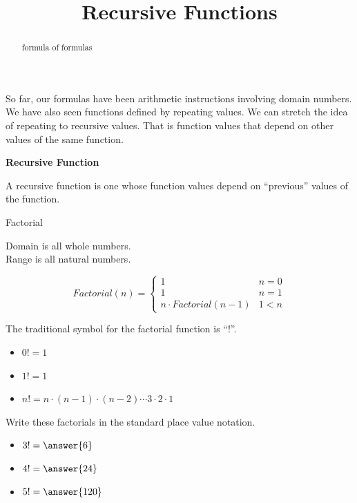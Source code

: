\documentclass{ximera}
\title{Recursive Functions}
\begin{document}
\begin{abstract}
formula of formulas
\end{abstract}
\maketitle



So far, our formulas have been arithmetic instructions involving domain numbers. We have also seen functions defined by repeating values. We can stretch the idea of repeating to recursive values.  That is function values that depend on other values of the same function.





\begin{idea} \textbf{\textcolor{blue!55!black}{Recursive Function}}


A recursive function is one whose function values depend on ``previous'' values of the function.

\end{idea}


\begin{example}  Factorial 



Domain is all whole numbers. \\
Range is all natural numbers. 




\[
Factorial(n) = 
\begin{cases}
  1 & n = 0 \\
  1 & n = 1 \\ 
  n \cdot Factorial(n-1) & 1 < n
\end{cases}
\]

The traditional symbol for the factorial function is ``!''.


\begin{itemize}
  \item $0! = 1$
  \item $1! = 1$
  \item $n! = n \cdot (n-1) \cdot (n-2) \cdots 3 \cdot 2 \cdot 1$
\end{itemize}





\begin{question} Write these factorials in the standard place value notation.


\begin{itemize}
\item $3! = \answer{6}$
\item $4! = \answer{24}$
\item $5! = \answer{120}$
\end{itemize}


\end{question}



\end{example}
\end{document}
